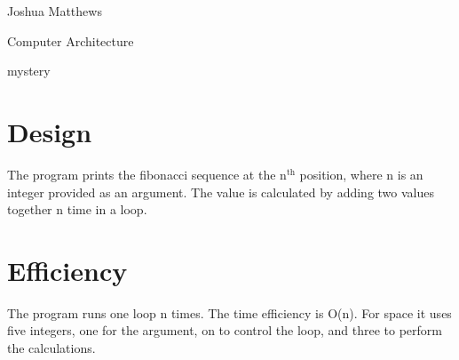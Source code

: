 \documentclass[letterpaper,12pt]{article}
\begin{document}
\noindent Joshua Matthews

\noindent Computer Architecture

\noindent mystery

\section{Design}
The program prints the fibonacci sequence at the n$^{\textrm{th}}$ position, where n is an integer provided as an argument. The value is calculated by adding two values together n time in a loop.

\section{Efficiency}
The program runs one loop n times. The time efficiency is O(n). For space it uses five integers, one for the argument, on to control the loop, and three to perform the calculations.
\end{document}
